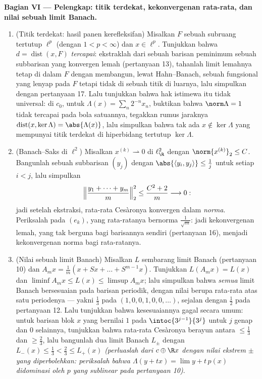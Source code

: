 \begin{problem}[{Soal akhir pekan --- $(\ell^p)' = \ell^q$,
kerefleksifan, dan keanehan $\ell^\infty$}]
\medskip
\noindent\textbf{Bagian VI --- Pelengkap: titik terdekat,
kekonvergenan rata-rata, dan nilai sebuah limit Banach.}
\begin{enumerate}[resume]
  \item (Titik terdekat: hasil panen kerefleksifan) Misalkan $F$
        sebuah subruang tertutup $\ell^p$ (dengan $1 < p < \infty$) dan
        $x \in \ell^p$. Tunjukkan bahwa $d = \operatorname{dist}(x,
        F)$ \emph{tercapai}: ekstraklah dari sebuah barisan peminimum
        sebuah subbarisan yang konvergen lemah (pertanyaan
        13), tahanlah limit lemahnya tetap di dalam $F$ dengan membangun, lewat
        Hahn--Banach, sebuah fungsional yang lenyap pada $F$ tetapi tidak di
        sebuah titik di luarnya, lalu simpulkan dengan pertanyaan 17.
        Lalu tunjukkan bahwa hak istimewa itu tidak universal: di $c_0$,
        untuk $\Lambda(x) = \sum_n2^{-n}x_n$, buktikan bahwa
        $\norm\Lambda = 1$ tidak tercapai pada bola satuannya,
        tegakkan rumus jaraknya
        $\operatorname{dist}(x, \ker\Lambda) =
        \abs{\Lambda(x)}$, lalu simpulkan bahwa tak ada $x \notin
        \ker\Lambda$ yang mempunyai titik terdekat di hiperbidang
        tertutup $\ker\Lambda$.
  \item (Banach--Saks di $\ell^2$) Misalkan $x^{(k)}
        \rightharpoonup 0$ di $\ell^2_{\R}$ dengan
        $\norm{x^{(k)}}_2 \leq C$. Bangunlah sebuah subbarisan
        $(y_j)$ dengan $\abs{\langle y_i, y_j\rangle} \leq
        \frac1j$ untuk setiap $i < j$, lalu simpulkan
        \[
        \Bigl\lVert\frac{y_1 + \dots + y_m}m\Bigr\rVert_2^2
        \leq \frac{C^2 + 2}m \longrightarrow 0 :
        \]
        jadi setelah ekstraksi, rata-rata Cesàronya konvergen dalam
        \emph{norma}. Periksalah pada $(e_k)$, yang rata-ratanya bernorma
        $\frac1{\sqrt m}$: jadi kekonvergenan lemah, yang tak berguna bagi
        barisannya sendiri (pertanyaan 16), menjadi kekonvergenan norma
        bagi rata-ratanya.
  \item (Nilai sebuah limit Banach) Misalkan $L$ sembarang limit
        Banach (pertanyaan 10) dan $A_mx = \frac1m(x + Sx + \dots
        + S^{m-1}x)$. Tunjukkan $L(A_mx) = L(x)$ dan $\liminf A_mx
        \leq L(x) \leq \limsup A_mx$; lalu simpulkan bahwa \emph{semua}
        limit Banach bersesuaian pada barisan periodik, dengan nilai
        berupa rata-rata atas satu periodenya --- yakni $\frac13$ pada $(1, 0, 0, 1,
        0, 0, \dots)$, sejalan dengan $\frac12$ pada
        pertanyaan 12. Lalu tunjukkan bahwa kesesuaiannya gagal secara umum: untuk
        barisan blok $x$ yang bernilai $1$ pada
        $\intoc{3^{j-1}}{3^j}$ untuk $j$ genap dan $0$ selainnya,
        tunjukkan bahwa rata-rata Cesàronya berayun antara $\leq
        \frac13$ dan $\geq \frac23$, lalu bangunlah dua limit Banach
        $L_\pm$ dengan $L_-(x) \leq \frac13 < \frac23
        \leq L_+(x)$ \emph{(perluaslah dari $c \oplus \R x$ dengan
        nilai ekstrem $\pm$ yang diperbolehkan: periksalah bahwa
        $\Lambda(y + tx) = \lim y + t\,p(x)$ didominasi oleh $p$ yang
        sublinear pada pertanyaan 10)}.

\end{enumerate}
\end{problem}
